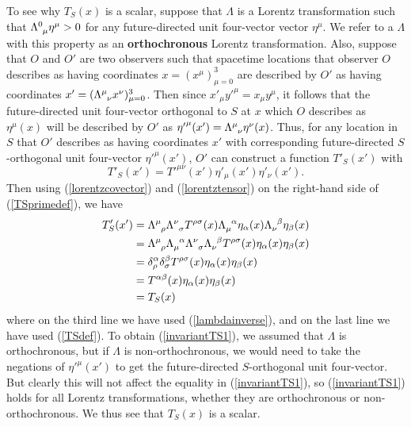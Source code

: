 To see why $T_S(x)$ is a scalar, suppose that $\Lambda$ is a Lorentz transformation such that $\Lambda\indices{^0_\mu}\eta^\mu>0$ for any future-directed  unit four-vector vector $\eta^\mu$. We refer to a $\Lambda$ with this property as an \textbf{orthochronous} Lorentz transformation. Also, suppose that $O$ and $O'$ are two observers such that spacetime locations that observer $O$ describes as having coordinates $x=(x^\mu)_{\mu=0}^3$ are described by $O'$ as having coordinates $x'=(\Lambda\indices{^\mu_\nu}x^\nu)_{\mu=0}^3$. Then since ${x'}_\mu{y'}^\mu= x_\mu y^\mu$, it follows that the future-directed unit four-vector orthogonal to $S$ at $x$ which $O$ describes as $\eta^\mu(x)$ will be described by $O'$ as  ${\eta'}^\mu(x')=\Lambda\indices{^\mu_\nu}\eta^\nu(x)$. Thus, for any location in $S$ that $O'$ describes as having coordinates $x'$ with corresponding  future-directed $S$-orthogonal unit four-vector ${\eta'}^\mu(x')$, $O'$ can construct a function $T'_S(x')$  with 
\begin{equation}\label{TSprimedef}
T'_S(x')=T'^{\mu\nu}(x')\eta'_{\mu}(x')\eta'_{\nu}(x').
\end{equation}
Then using  (\ref{lorentzcovector}) and (\ref{lorentztensor}) on the right-hand side of (\ref{TSprimedef}),  we have
\begin{equation}\label{invariantTS1}
\begin{split}
T'_S(x')&=\Lambda\indices{^\mu_\rho}\Lambda\indices{^\nu_\sigma}T^{\rho\sigma}(x)\Lambda\indices{_\mu^\alpha}\eta_{\alpha}(x)\Lambda\indices{_\nu^\beta}\eta_{\beta}(x)\\
&=\Lambda\indices{^\mu_\rho}\Lambda\indices{_\mu^\alpha} \Lambda\indices{^\nu_\sigma}\Lambda\indices{_\nu^\beta}T^{\rho\sigma}(x)\eta_{\alpha}(x)\eta_{\beta}(x)\\
&=\delta^\alpha_\rho\delta^\beta_\sigma T^{\rho\sigma}(x)\eta_{\alpha}(x)\eta_{\beta}(x)\\
&=T^{\alpha\beta}(x)\eta_{\alpha}(x)\eta_{\beta}(x)\\
&=T_S(x)
\end{split}
\end{equation}
where on the third line we have used (\ref{lambdainverse}), and on the last line we have used (\ref{TSdef}). To obtain (\ref{invariantTS1}), we assumed that $\Lambda$ is orthochronous, but if $\Lambda$ is non-orthochronous, we would need to take the negations of ${\eta'}^\mu(x')$ to get the future-directed $S$-orthogonal unit four-vector. But clearly this will not affect the equality in (\ref{invariantTS1}), so (\ref{invariantTS1}) holds for all Lorentz transformations, whether they are orthochronous or non-orthochronous.  We thus see that   $T_S(x)$ is a scalar.


